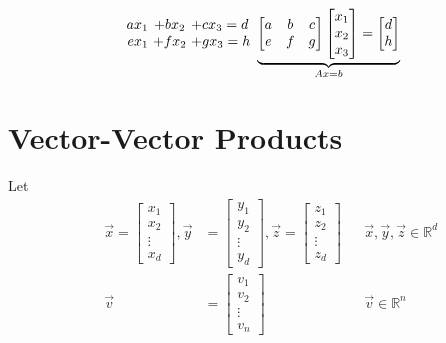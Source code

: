 \documentclass[12pt]{article}
\begin{document}
\begin{description}
\begin{align*}
{\begin{array}{r@{\ }c@{\ }l}
                ax_1 & +bx_2 & +cx_3 = d \\
                ex_1 & +fx_2 & +gx_3 = h
            \end{array}
        }{\underbrace{\left[\begin{matrix}a&b&c\\e&f&g\end{matrix}\right]\begin{bmatrix} x_1 \\ x_2 \\ x_3 \end{bmatrix} = \begin{bmatrix} d \\ h  \end{bmatrix}}_{Ax=b}}
    \end{align*}
            
\end{description}

\section{Vector-Vector Products}
Let
\begin{align*}
    && \vec{x} = \begin{bmatrix} x_1 \\ x_2 \\ \vdots \\ x_d \end{bmatrix}, \vec{y} &= \begin{bmatrix} y_1 \\ y_2 \\ \vdots \\ y_d \end{bmatrix},
    \vec{z} = \begin{bmatrix} z_1 \\ z_2 \\ \vdots \\ z_d \end{bmatrix}&& \vec{x},\vec{y}, \vec{z} \in \mathbb{R}^d \\
    && \vec{v} &= \begin{bmatrix} v_1 \\ v_2 \\ \vdots \\ v_n \end{bmatrix}&& \vec{v} \in \mathbb{R}^n
\end{align*}
\end{document}
